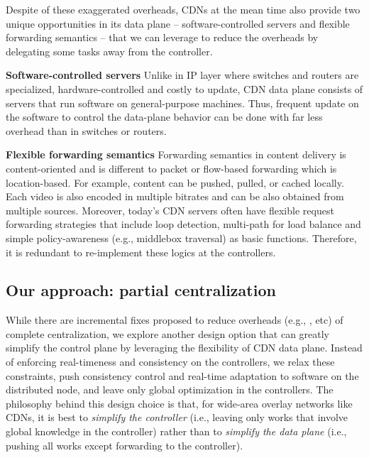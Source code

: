
Despite of these exaggerated overheads, CDNs at the mean time also provide two unique opportunities in its data plane -- software-controlled servers and flexible forwarding semantics -- that we can leverage to reduce the overheads by delegating some tasks away from the controller.
\begin{packeditemize}
	\item {\bf Software-controlled servers} Unlike in IP layer where switches and routers are specialized, hardware-controlled and costly to update, CDN data plane consists of servers that run software on general-purpose machines. Thus, frequent update on the software to control the data-plane behavior can be done with far less overhead than in switches or routers. 
	\item {\bf Flexible forwarding semantics} Forwarding semantics in content delivery is content-oriented and is different to packet or flow-based forwarding which is location-based. For example, content can be pushed, pulled, or cached locally. Each video is also encoded in multiple bitrates and can be also obtained from multiple sources. Moreover, today's CDN servers often have flexible request forwarding strategies that include loop detection, multi-path for load balance and simple policy-awareness (e.g., middlebox traversal) as basic functions. Therefore, it is redundant to re-implement these logics at the controllers.
\end{packeditemize}



\subsection{Our approach: partial centralization}

While there are incremental fixes proposed to reduce overheads (e.g., \cite{DevoFlow, Onix, Kandoo}, etc) of complete centralization, we explore another design option that can greatly simplify the control plane by leveraging the flexibility of CDN data plane. 
Instead of enforcing real-timeness and consistency on the controllers, we relax these constraints, push consistency control and real-time adaptation to software on the distributed node, and leave only global optimization in the controllers.
The philosophy behind this design choice is that, for wide-area overlay networks like CDNs, it is best to {\it simplify the controller} (i.e., leaving only works that involve global knowledge in the controller) rather than to {\it simplify the data plane} (i.e., pushing all works except forwarding to the controller).


